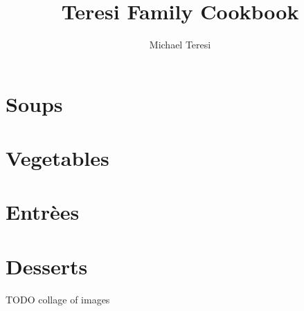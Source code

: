 \documentclass[]{article}
\begin{document}
\title{Teresi Family Cookbook}
\author{Michael Teresi}
\maketitle

\tableofcontents


\clearpage
\section{Soups}



\clearpage
\section{Vegetables}


\clearpage
\section{Entr\`{e}es}




\clearpage
\section{Desserts}
TODO collage of images




\end{document}
